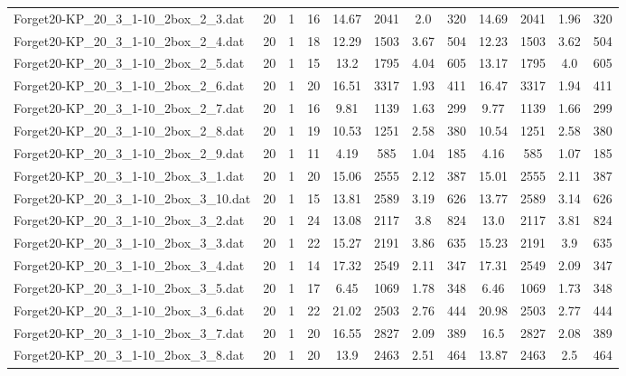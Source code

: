 \begin{sidewaystable}[!ht]
{\begin{tabular}{lccccccccccc}
Forget20-KP\_20\_3\_1-10\_2box\_2\_3.dat & 20 & 1 & 16 & 14.67 & 2041 & 2.0 & 320 & 14.69 & 2041 &  \textcolor{blue2}{1.96} & 320 \\
Forget20-KP\_20\_3\_1-10\_2box\_2\_4.dat & 20 & 1 & 18 & 12.29 & 1503 & 3.67 & 504 & 12.23 & 1503 &  \textcolor{blue2}{3.62} & 504 \\
Forget20-KP\_20\_3\_1-10\_2box\_2\_5.dat & 20 & 1 & 15 & 13.2 & 1795 & 4.04 & 605 & 13.17 & 1795 &  \textcolor{blue2}{4.0} & 605 \\
Forget20-KP\_20\_3\_1-10\_2box\_2\_6.dat & 20 & 1 & 20 & 16.51 & 3317 &  \textcolor{blue2}{1.93} & 411 & 16.47 & 3317 & 1.94 & 411 \\
Forget20-KP\_20\_3\_1-10\_2box\_2\_7.dat & 20 & 1 & 16 & 9.81 & 1139 &  \textcolor{blue2}{1.63} & 299 & 9.77 & 1139 & 1.66 & 299 \\
Forget20-KP\_20\_3\_1-10\_2box\_2\_8.dat & 20 & 1 & 19 & 10.53 & 1251 &  \textcolor{blue2}{2.58} & 380 & 10.54 & 1251 &  \textcolor{blue2}{2.58} & 380 \\
Forget20-KP\_20\_3\_1-10\_2box\_2\_9.dat & 20 & 1 & 11 & 4.19 & 585 & 1.04 & 185 & 4.16 & 585 & 1.07 & 185 \\
Forget20-KP\_20\_3\_1-10\_2box\_3\_1.dat & 20 & 1 & 20 & 15.06 & 2555 & 2.12 & 387 & 15.01 & 2555 &  \textcolor{blue2}{2.11} & 387 \\
Forget20-KP\_20\_3\_1-10\_2box\_3\_10.dat & 20 & 1 & 15 & 13.81 & 2589 & 3.19 & 626 & 13.77 & 2589 &  \textcolor{blue2}{3.14} & 626 \\
Forget20-KP\_20\_3\_1-10\_2box\_3\_2.dat & 20 & 1 & 24 & 13.08 & 2117 &  \textcolor{blue2}{3.8} & 824 & 13.0 & 2117 & 3.81 & 824 \\
Forget20-KP\_20\_3\_1-10\_2box\_3\_3.dat & 20 & 1 & 22 & 15.27 & 2191 &  \textcolor{blue2}{3.86} & 635 & 15.23 & 2191 & 3.9 & 635 \\
Forget20-KP\_20\_3\_1-10\_2box\_3\_4.dat & 20 & 1 & 14 & 17.32 & 2549 & 2.11 & 347 & 17.31 & 2549 &  \textcolor{blue2}{2.09} & 347 \\
Forget20-KP\_20\_3\_1-10\_2box\_3\_5.dat & 20 & 1 & 17 & 6.45 & 1069 & 1.78 & 348 & 6.46 & 1069 &  \textcolor{blue2}{1.73} & 348 \\
Forget20-KP\_20\_3\_1-10\_2box\_3\_6.dat & 20 & 1 & 22 & 21.02 & 2503 &  \textcolor{blue2}{2.76} & 444 & 20.98 & 2503 & 2.77 & 444 \\
Forget20-KP\_20\_3\_1-10\_2box\_3\_7.dat & 20 & 1 & 20 & 16.55 & 2827 & 2.09 & 389 & 16.5 & 2827 &  \textcolor{blue2}{2.08} & 389 \\
Forget20-KP\_20\_3\_1-10\_2box\_3\_8.dat & 20 & 1 & 20 & 13.9 & 2463 & 2.51 & 464 & 13.87 & 2463 &  \textcolor{blue2}{2.5} & 464 \\

\end{tabular}}
\end{sidewaystable}
